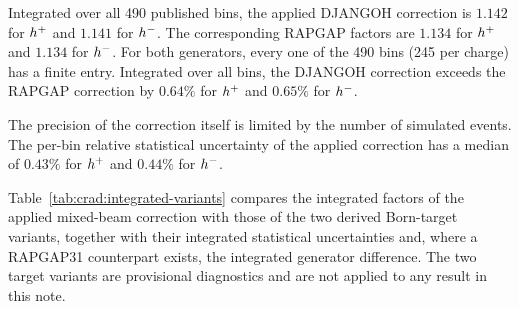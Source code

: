 Integrated over all 490 published bins, the applied DJANGOH correction is
$1.142$ for $h^{+}$ and $1.141$ for
$h^{-}$.  The corresponding RAPGAP factors are $1.134$
for $h^{+}$ and $1.134$ for $h^{-}$.  For both
generators, every one of the 490 bins (245 per charge) has a finite
entry.  Integrated over all bins, the DJANGOH correction exceeds the
RAPGAP correction by $0.64\%$ for $h^{+}$ and $0.65\%$ for
$h^{-}$.

The precision of the correction itself is limited by the number of
simulated events.  The per-bin relative statistical uncertainty of the
applied correction has a median of $0.43\%$ for $h^{+}$ and
$0.44\%$ for $h^{-}$.

Table~\ref{tab:crad:integrated-variants} compares the integrated factors of
the applied mixed-beam correction with those of the two derived Born-target
variants, together with their integrated statistical uncertainties and,
where a RAPGAP31 counterpart exists, the integrated generator difference.
The two target variants are provisional diagnostics and are not applied to
any result in this note.

